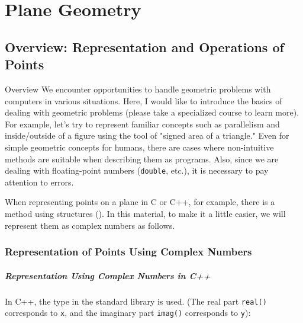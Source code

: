\chapter{Plane Geometry}

\section{Overview: Representation and Operations of Points}

\begin{itembox}[l]{Overview}
We encounter opportunities to handle geometric problems with computers in various situations. Here, I would like to introduce the basics of dealing with geometric problems (please take a specialized course to learn more). For example, let's try to represent familiar concepts such as parallelism and inside/outside of a figure using the tool of "signed area of a triangle." Even for simple geometric concepts for humans, there are cases where non-intuitive methods are suitable when describing them as programs. Also, since we are dealing with floating-point numbers (\texttt{double}, etc.), it is necessary to pay attention to errors.
\end{itembox}

When representing points on a plane in C or C++, for example, there is a method using structures (\pcaojbook[pp.~365--(Chapter 16)]). In this material, to make it a little easier, we will represent them as complex numbers as follows.
\subsection{Representation of Points Using Complex Numbers}

\paragraph{Representation Using Complex Numbers in C++}
In C++, the  type in the standard library is used. (The real part \texttt{real()} corresponds to \texttt{x}, and the imaginary part \texttt{imag()} corresponds to \texttt{y}):
\begin{center}
\end{center}


